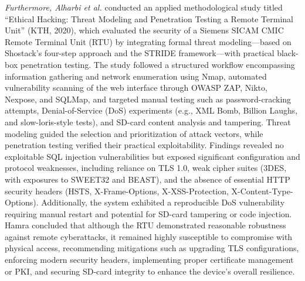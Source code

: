 \textit{Furthermore, Alharbi et al.} conducted an applied methodological study titled ``Ethical Hacking: Threat Modeling and Penetration Testing a Remote Terminal Unit'' (KTH, 2020), which evaluated the security of a Siemens SICAM CMIC Remote Terminal Unit (RTU) by integrating formal threat modeling—based on Shostack's four-step approach and the STRIDE framework—with practical black-box penetration testing. The study followed a structured workflow encompassing information gathering and network enumeration using Nmap, automated vulnerability scanning of the web interface through OWASP ZAP, Nikto, Nexpose, and SQLMap, and targeted manual testing such as password-cracking attempts, Denial-of-Service (DoS) experiments (e.g., XML Bomb, Billion Laughs, and slow-loris-style tests), and SD-card content analysis and tampering. Threat modeling guided the selection and prioritization of attack vectors, while penetration testing verified their practical exploitability. Findings revealed no exploitable SQL injection vulnerabilities but exposed significant configuration and protocol weaknesses, including reliance on TLS 1.0, weak cipher suites (3DES, with exposures to SWEET32 and BEAST), and the absence of essential HTTP security headers (HSTS, X-Frame-Options, X-XSS-Protection, X-Content-Type-Options). Additionally, the system exhibited a reproducible DoS vulnerability requiring manual restart and potential for SD-card tampering or code injection. Hamra concluded that although the RTU demonstrated reasonable robustness against remote cyberattacks, it remained highly susceptible to compromise with physical access, recommending mitigations such as upgrading TLS configurations, enforcing modern security headers, implementing proper certificate management or PKI, and securing SD-card integrity to enhance the device's overall resilience. \cite{alharbi2020}

